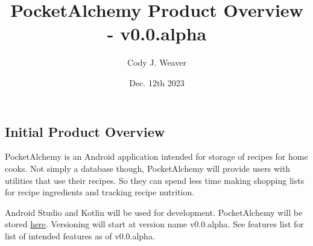 \documentclass[12pt]{article}
\begin{document}
\title{PocketAlchemy Product Overview - v0.0.alpha}
\author{Cody J. Weaver}
\date{Dec. 12th 2023}
\maketitle

\begin{center}
\section*{Initial Product Overview}
\end{center}

\indent PocketAlchemy is an Android application intended for storage 
of recipes for home cooks. Not simply a database though, PocketAlchemy 
will provide users with utilities that use their recipes. So they can spend
less time making shopping lists for recipe ingredients and tracking 
recipe nutrition.

\indent Android Studio and Kotlin will be used for development. PocketAlchemy
will be stored \href{https://github.com/CODYJEWELLWEAVER/PocketAlchemy}{here}.
Versioning will start at version name v0.0.alpha. See features list for list 
of intended features as of v0.0.alpha.

    
\end{document}
